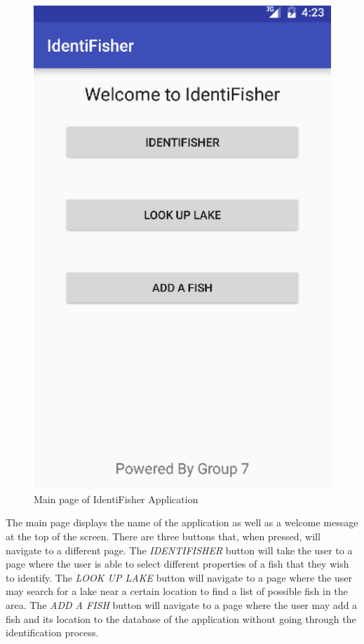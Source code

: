 \documentclass{article}
\begin{document}
\begin{figure}[H]
	\includegraphics[scale=0.16]{Mainpage.png}
	\caption{Main page of IdentiFisher Application}
\end{figure}

The main page displays the name of the application as well as a welcome message at the top of the screen. There are three
buttons that, when pressed, will navigate to a different page. The  \textit{IDENTIFISHER} button will take the user to a page
where the user is able to select different properties of a fish that they wish to identify. The \textit{LOOK UP LAKE} button will navigate to a page where the
user may search for a lake near a certain location to find a list of possible fish in the area. The \textit{ADD A FISH} button will navigate
to a page where the user may add a fish and its location to the database of the application without going through the identification process.\\
\end{document}
